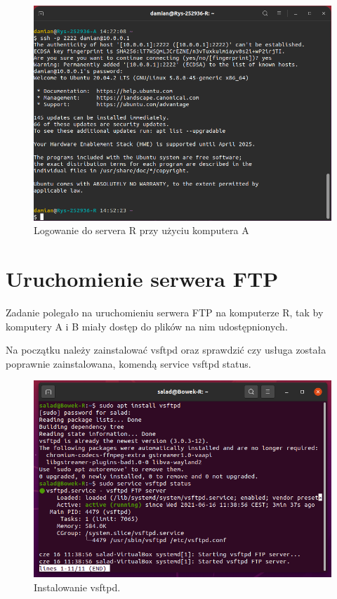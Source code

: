 \documentclass{article}
\begin{document}
\begin{figure}[H]
    \centering
    \includegraphics[scale = 0.6]{7.SSH/VirtualBoxVM_6umd4MDHVJ.png}  
    \caption{Logowanie do servera R przy użyciu komputera A}
    \label{2}
\end{figure}

\newpage
\section{Uruchomienie serwera FTP}
Zadanie polegało na uruchomieniu serwera FTP na komputerze R, tak by komputery A i B miały dostęp do plików na nim udostępnionych.

Na początku należy zainstalować vsftpd oraz sprawdzić czy usługa została poprawnie zainstalowana, komendą service vsftpd status.
\begin{figure}[H]
    \centering
    \includegraphics[scale = 0.65]{ftp/FTP_1.png}  
    \caption{Instalowanie vsftpd.}
    \label{3}
\end{figure}
\end{document}
